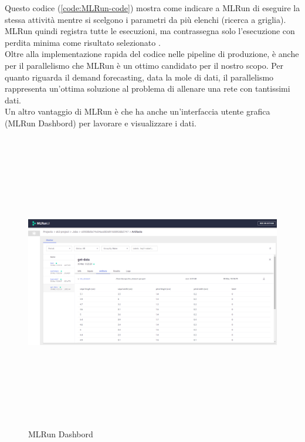 \documentclass[12pt,a4paper]{report}
\begin{document}
Questo codice (\ref{code:MLRun-code}) mostra come indicare a MLRun di eseguire la stessa attività mentre si scelgono i parametri da più elenchi (ricerca a griglia). MLRun quindi registra tutte le esecuzioni, ma contrassegna solo l'esecuzione con perdita minima come risultato selezionato \cite{MLRun}.
\\
Oltre alla implementazione rapida del codice nelle pipeline di produzione, è anche per il parallelismo che MLRun è un ottimo candidato per il nostro scopo. Per quanto riguarda il demand forecasting, data la mole di dati, il parallelismo rappresenta un'ottima soluzione al problema di allenare una rete con tantissimi dati.\\
Un altro vantaggio di MLRun è che ha anche un'interfaccia utente grafica (MLRun Dashbord) per lavorare e visualizzare i dati.
\begin{figure}[h!]
    \begin{center}
        \includegraphics[width=13cm,height=13cm,keepaspectratio]{MLRun Dashbord}
    \end{center}
    \caption{MLRun Dashbord}
    \label{fig:MLRun-dashbord}
\end{figure}
\end{document}
